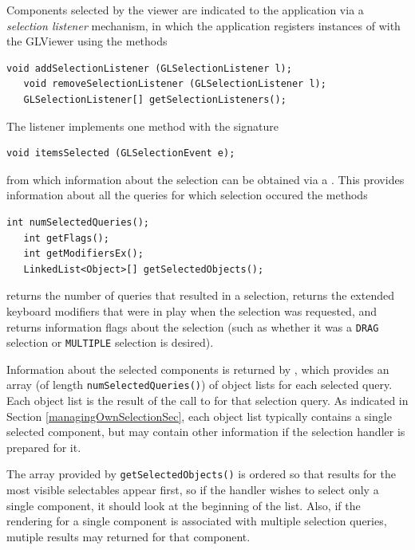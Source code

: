 \documentclass{article}
\begin{document}
Components selected by the viewer are indicated to the application via a
{\it selection listener} mechanism, in which the application registers
instances of  with the GLViewer
using the methods
\begin{lstlisting}[]
   void addSelectionListener (GLSelectionListener l);
   void removeSelectionListener (GLSelectionListener l);
   GLSelectionListener[] getSelectionListeners();
\end{lstlisting}
The listener implements one method with the signature
\begin{lstlisting}[]
   void itemsSelected (GLSelectionEvent e);
\end{lstlisting}
from which information about the selection can be obtained via a
. 
This provides information about all the
queries for which selection occured the methods
\begin{lstlisting}[]
   int numSelectedQueries();
   int getFlags();
   int getModifiersEx();
   LinkedList<Object>[] getSelectedObjects();
\end{lstlisting}
returns the number
of queries that resulted in a selection,
returns the extended
keyboard modifiers that were in play when the selection was requested,
and  returns information
flags about the selection (such as whether it was a {\tt DRAG}
selection or {\tt MULTIPLE} selection is desired).

Information about the selected components is returned by
, 
which provides an
array (of length {\tt numSelectedQueries()}) of object lists for
each selected query. Each object list is the result of the call to
 for that 
selection query. As
indicated in Section \ref{managingOwnSelectionSec}, each object list
typically contains a single selected component, but may contain other
information if the selection handler is prepared for it.

The array provided by {\tt getSelectedObjects()} is ordered so that
results for the most visible selectables appear first, so if the
handler wishes to select only a single component, it should look at
the beginning of the list. Also, if the rendering for a single
component is associated with multiple selection queries, mutiple
results may returned for that component.
\end{document}
